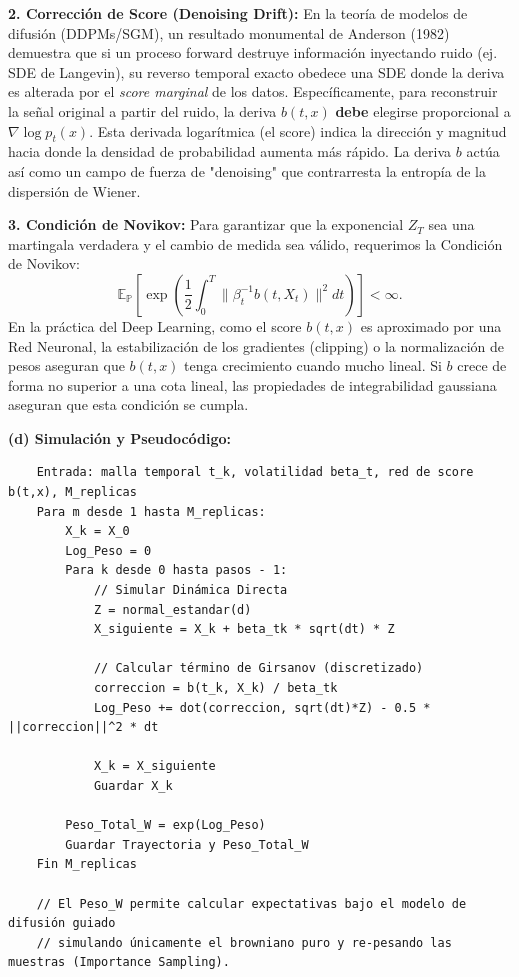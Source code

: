 \documentclass[11pt, letterpaper]{article}
\begin{document}
\begin{solucion}
    \textbf{2. Corrección de Score (Denoising Drift):}
    En la teoría de modelos de difusión (DDPMs/SGM), un resultado monumental de Anderson (1982) demuestra que si un proceso forward destruye información inyectando ruido (ej. SDE de Langevin), su reverso temporal exacto obedece una SDE donde la deriva es alterada por el \textit{score marginal} de los datos. 
    Específicamente, para reconstruir la señal original a partir del ruido, la deriva $b(t, x)$ \textbf{debe} elegirse proporcional a $\nabla \log p_t(x)$. Esta derivada logarítmica (el score) indica la dirección y magnitud hacia donde la densidad de probabilidad aumenta más rápido. La deriva $b$ actúa así como un campo de fuerza de "denoising" que contrarresta la entropía de la dispersión de Wiener.

    \textbf{3. Condición de Novikov:}
    Para garantizar que la exponencial $Z_T$ sea una martingala verdadera y el cambio de medida sea válido, requerimos la Condición de Novikov:
    \[ \mathbb{E}_{\mathbb{P}}\left[ \exp\left( \frac{1}{2} \int_0^T \|\beta_t^{-1} b(t, X_t)\|^2 dt \right) \right] < \infty. \]
    En la práctica del Deep Learning, como el score $b(t,x)$ es aproximado por una Red Neuronal, la estabilización de los gradientes (clipping) o la normalización de pesos aseguran que $b(t, x)$ tenga crecimiento cuando mucho lineal. Si $b$ crece de forma no superior a una cota lineal, las propiedades de integrabilidad gaussiana aseguran que esta condición se cumpla.

    \textbf{(d) Simulación y Pseudocódigo:}
    \begin{verbatim}
    Entrada: malla temporal t_k, volatilidad beta_t, red de score b(t,x), M_replicas
    Para m desde 1 hasta M_replicas:
        X_k = X_0
        Log_Peso = 0
        Para k desde 0 hasta pasos - 1:
            // Simular Dinámica Directa
            Z = normal_estandar(d)
            X_siguiente = X_k + beta_tk * sqrt(dt) * Z
            
            // Calcular término de Girsanov (discretizado)
            correccion = b(t_k, X_k) / beta_tk
            Log_Peso += dot(correccion, sqrt(dt)*Z) - 0.5 * ||correccion||^2 * dt
            
            X_k = X_siguiente
            Guardar X_k
            
        Peso_Total_W = exp(Log_Peso)
        Guardar Trayectoria y Peso_Total_W
    Fin M_replicas
    
    // El Peso_W permite calcular expectativas bajo el modelo de difusión guiado
    // simulando únicamente el browniano puro y re-pesando las muestras (Importance Sampling).
    \end{verbatim}
\end{solucion}
\end{document}
